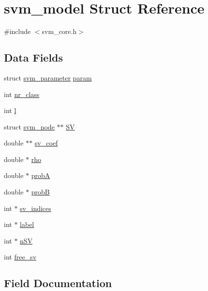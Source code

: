 \hypertarget{structsvm__model}{}\section{svm\+\_\+model Struct Reference}
\label{structsvm__model}


{\ttfamily \#include $<$svm\+\_\+core.\+h$>$}

\subsection*{Data Fields}
\begin{DoxyCompactItemize}
\item 
struct \hyperlink{structsvm__parameter}{svm\+\_\+parameter} \hyperlink{structsvm__model_a95f43f398a173e63d0ce26911d0a9273}{param}
\item 
int \hyperlink{structsvm__model_a5af6e0cfb063e8aac03c99aa9d319116}{nr\+\_\+class}
\item 
int \hyperlink{structsvm__model_ab858d7eed0bd3cc4c33c094872643d0a}{l}
\item 
struct \hyperlink{structsvm__node}{svm\+\_\+node} $\ast$$\ast$ \hyperlink{structsvm__model_a96da6fe173a7150dae95bf55d5539e45}{SV}
\item 
double $\ast$$\ast$ \hyperlink{structsvm__model_a978084d722ac886100ffcc35fc931143}{sv\+\_\+coef}
\item 
double $\ast$ \hyperlink{structsvm__model_a16e4dea1508f93ece4384ec35c991887}{rho}
\item 
double $\ast$ \hyperlink{structsvm__model_adf5f28fcdd3ca1c5b23c1f6167710a04}{probA}
\item 
double $\ast$ \hyperlink{structsvm__model_a73ba8feaaf3c2c38c6bb81f7bcb5809e}{probB}
\item 
int $\ast$ \hyperlink{structsvm__model_add7f649bf78428c38a282ed8776fa433}{sv\+\_\+indices}
\item 
int $\ast$ \hyperlink{structsvm__model_ac66d192809e92b95875bdf8ebb749060}{label}
\item 
int $\ast$ \hyperlink{structsvm__model_a1d342c9b9e5e4a6377862e13123a25ef}{n\+SV}
\item 
int \hyperlink{structsvm__model_a2ae57ce1fa43497d151aff26c21a13a1}{free\+\_\+sv}
\end{DoxyCompactItemize}


\subsection{Field Documentation}
